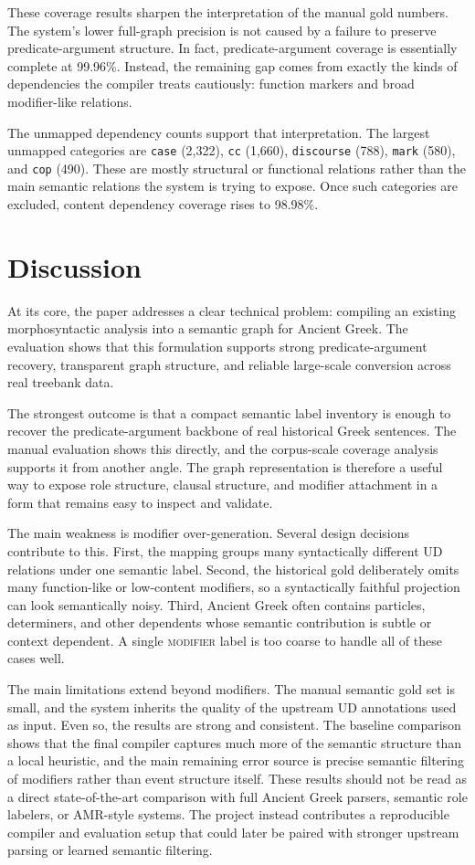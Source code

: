 \documentclass[11pt]{article}
\begin{document}
These coverage results sharpen the interpretation of the manual gold numbers.
The system's lower full-graph precision is not caused by a failure to preserve
predicate-argument structure. In fact, predicate-argument coverage is essentially
complete at 99.96\%. Instead, the remaining gap comes from exactly the kinds of
dependencies the compiler treats cautiously: function markers and broad
modifier-like relations.

The unmapped dependency counts support that interpretation. The largest unmapped
categories are \texttt{case} (2,322), \texttt{cc} (1,660), \texttt{discourse}
(788), \texttt{mark} (580), and \texttt{cop} (490). These are mostly structural
or functional relations rather than the main semantic relations the system is
trying to expose. Once such categories are excluded, content dependency coverage
rises to 98.98\%.

\section{Discussion}
At its core, the paper addresses a clear technical problem: compiling an existing
morphosyntactic analysis into a semantic graph for Ancient Greek. The evaluation
shows that this formulation supports strong predicate-argument recovery,
transparent graph structure, and reliable large-scale conversion across real
treebank data.

The strongest outcome is that a compact semantic label inventory is enough to
recover the predicate-argument backbone of real historical Greek sentences. The
manual evaluation shows this directly, and the corpus-scale coverage analysis
supports it from another angle. The graph representation is therefore a useful
way to expose role structure, clausal structure, and modifier attachment in a
form that remains easy to inspect and validate.

The main weakness is modifier over-generation. Several design decisions
contribute to this. First, the mapping groups many syntactically different UD
relations under one semantic label. Second, the historical gold deliberately
omits many function-like or low-content modifiers, so a syntactically faithful
projection can look semantically noisy. Third, Ancient Greek often contains
particles, determiners, and other dependents whose semantic contribution is
subtle or context dependent. A single \textsc{modifier} label is too coarse to
handle all of these cases well.

The main limitations extend beyond modifiers. The manual semantic
gold set is small, and the system inherits the quality of the upstream UD
annotations used as input. Even so, the results are strong and consistent. The
baseline comparison shows that the final compiler captures much more of the
semantic structure than a local heuristic, and the main remaining error source
is precise semantic filtering of modifiers rather than event structure itself.
These results should not be read as a direct state-of-the-art comparison with
full Ancient Greek parsers, semantic role labelers, or AMR-style systems. The
project instead contributes a reproducible compiler and evaluation setup that
could later be paired with stronger upstream parsing or learned semantic
filtering.
\end{document}
